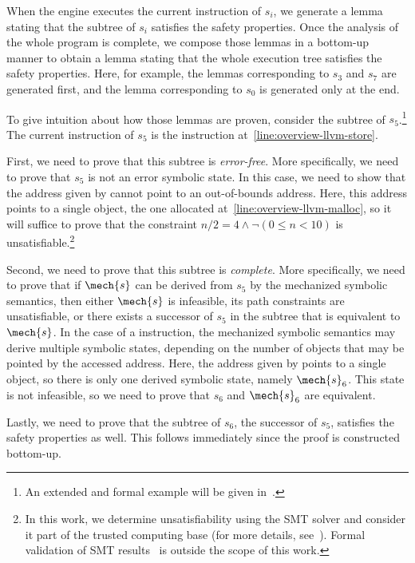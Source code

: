 When the \SE engine executes the current instruction of $s_i$,
we generate a lemma stating that the subtree of $s_i$ satisfies the safety properties.
Once the analysis of the whole program is complete,
we compose those lemmas in a bottom-up manner to obtain a lemma stating that the whole execution tree satisfies the safety properties.
Here, for example,
the lemmas corresponding to $s_3$ and $s_7$ are generated first, and the lemma corresponding to $s_0$ is generated only at the end.

To give intuition about how those lemmas are proven, consider the subtree of $s_5$.\footnote{
An extended and formal example will be given in~.
}
The current instruction of $s_5$ is the  instruction at~\cref{line:overview-llvm-store}.

First, we need to prove that this subtree is \emph{error-free}.
More specifically,
we need to prove that $s_5$ is not an error symbolic state.
In this case,
we need to show that the address given by  cannot point to an out-of-bounds address.
Here, this address points to a single object,
the one allocated at~\cref{line:overview-llvm-malloc},
so it will suffice to prove that the constraint $n / 2 = 4 \land \neg (0 \leq n < 10)$ is unsatisfiable.\footnote{
In this work, we determine unsatisfiability using the SMT solver and consider it part of the trusted computing base (for more details, see~).
Formal validation of SMT results~\cite{armand2011modular,ekici2017smtcoq,de2008proofs,marx2013proof,flippo2024multi,mcilree2024proof,van2025efficient} is outside the scope of this work.
}

Second, we need to prove that this subtree is \emph{complete}.
More specifically,
we need to prove that if $\mech{s}$ can be derived from $s_5$ by the mechanized symbolic semantics,
then either $\mech{s}$ is infeasible, \ie its path constraints are unsatisfiable, or there exists a successor of $s_5$ in the subtree that is equivalent to $\mech{s}$.
In the case of a  instruction,
the mechanized symbolic semantics may derive multiple symbolic states,
depending on the number of objects that may be pointed by the accessed address.
Here, the address given by  points to a single object, so there is only one derived symbolic state, namely $\mech{s}_6$.
This state is not infeasible,
so we need to prove that $s_6$ and $\mech{s}_6$ are equivalent.

Lastly, we need to prove that the subtree of $s_6$, \ie the successor of $s_5$, satisfies the safety properties as well.
This follows immediately since the proof is constructed bottom-up.
